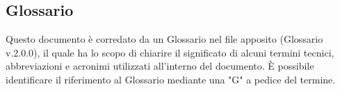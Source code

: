 \subsection{Glossario}
Questo documento è corredato da un Glossario nel file apposito (Glossario v.2.0.0), il quale ha lo scopo di chiarire il significato di alcuni termini tecnici, abbreviazioni e acronimi utilizzati all'interno del documento. È possibile identificare il riferimento al Glossario mediante una "G" a pedice del termine.
